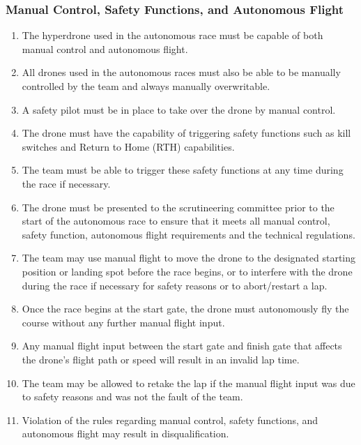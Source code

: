     \subsubsection{Manual Control, Safety Functions, and Autonomous Flight}
    \begin{enumerate}[resume]
    \item The hyperdrone used in the autonomous race must be capable of both manual control and autonomous flight.
    \item All drones used in the autonomous races must also be able to be manually controlled by the team and always manually overwritable.
    \item A safety pilot must be in place to take over the drone by manual control.
    \item The drone must have the capability of triggering safety functions such as kill switches and Return to Home (RTH) capabilities.
    \item The team must be able to trigger these safety functions at any time during the race if necessary.
    \item The drone must be presented to the scrutineering committee prior to the start of the autonomous race to ensure that it meets all manual control, safety function, autonomous flight requirements and the technical regulations.
    \item The team may use manual flight to move the drone to the designated starting position or landing spot before the race begins, or to interfere with the drone during the race if necessary for safety reasons or to abort/restart a lap.
    \item Once the race begins at the start gate, the drone must autonomously fly the course without any further manual flight input.
    \item Any manual flight input between the start gate and finish gate that affects the drone's flight path or speed will result in an invalid lap time.
    \item The team may be allowed to retake the lap if the manual flight input was due to safety reasons and was not the fault of the team.
    \item Violation of the rules regarding manual control, safety functions, and autonomous flight may result in disqualification.
    \end{enumerate}





